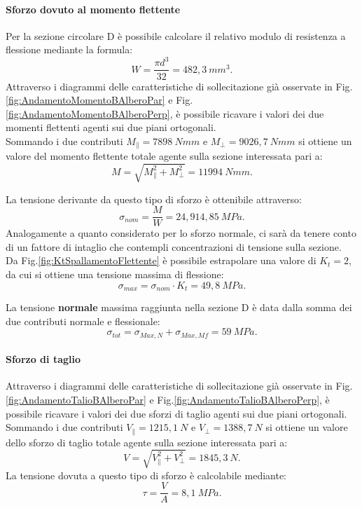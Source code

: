 \paragraph{Sforzo dovuto al momento flettente}
Per la sezione circolare D è possibile calcolare il relativo modulo di resistenza a flessione mediante la formula:
\begin{equation}
    W=\frac{\pi d^3}{32}=482,3\ mm^3.
    \label{W_D}
\end{equation}
Attraverso i diagrammi delle caratteristiche di sollecitazione già osservate in Fig.\ref{fig:AndamentoMomentoBAlberoPar} e Fig.\ref{fig:AndamentoMomentoBAlberoPerp}, è possibile ricavare i valori dei due momenti flettenti agenti sui due piani ortogonali.\\ 
Sommando i due contributi $M_{\parallel}=7898\ Nmm$ e $M_{\perp}=9026,7\ Nmm$ si ottiene un valore del momento flettente totale agente sulla sezione interessata pari a:
\begin{equation}
    M=\sqrt{M_{\parallel}^2+M_{\perp}^2}=11994\ Nmm.
\end{equation}

La tensione derivante da questo tipo di sforzo è ottenibile attraverso:
\begin{equation}
    \sigma_{nom}=\frac{M}{W}=24,914,85\ MPa.
\end{equation}
Analogamente a quanto considerato per lo sforzo normale, ci sarà da tenere conto di un fattore di intaglio che contempli concentrazioni di tensione sulla sezione. \\
Da Fig.\ref{fig:KtSpallamentoFlettente} è possibile estrapolare una valore di $K_t=2$, da cui si ottiene una tensione massima di flessione:
 \begin{equation}
     \sigma_{max}=\sigma_{nom}\cdot K_t= 49,8\ MPa.
 \end{equation}
 
 La tensione \textbf{normale} massima raggiunta nella sezione D è data dalla somma dei due contributi normale e flessionale:
\begin{equation}
    \sigma_{tot}=\sigma_{Max,N}+\sigma_{Max,Mf}=59\ MPa.
\end{equation}
\paragraph{Sforzo di taglio}
 Attraverso i diagrammi delle caratteristiche di sollecitazione già osservate in Fig.\ref{fig:AndamentoTalioBAlberoPar} e Fig.\ref{fig:AndamentoTalioBAlberoPerp}, è possibile ricavare i valori dei due sforzi di taglio agenti sui due piani ortogonali.\\ 
Sommando i due contributi $V_{\parallel}=1215,1\ N$ e $V_{\perp}=1388,7\ N$ si ottiene un valore dello sforzo di taglio totale agente sulla sezione interessata pari a:
\begin{equation}
    V=\sqrt{V_{\parallel}^2+V_{\perp}^2}=1845,3\ N.
\end{equation}
La tensione dovuta a questo tipo di sforzo è calcolabile mediante:
\begin{equation}
    \tau=\frac{V}{A}=8,1\ MPa.
\end{equation}
